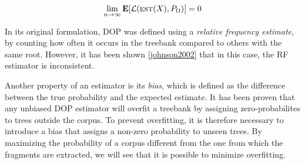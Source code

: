 $$\lim_{n \to \infty} \mathbf{E}[\mathcal{L}(\textsc{est}(X), P_\Omega)] = 0 $$


In its original formulation, DOP was defined using a \emph{relative frequency estimate}, by counting how often it occurs in the treebank compared to others with the same root. However, it has been shown \ref{johnson2002} that in this case, the RF estimator is inconsistent.

Another property of an estimator is its \emph{bias}, which is defined as the difference between the true probability and the expected estimate. 
It has been proven that any unbiased DOP estimator will overfit a treebank by assigning zero-probabilites to trees outside the corpus.
To prevent overfitting, it is therefore necessary to introduce a bias that assigns a non-zero probability to unseen trees.
By maximizing the probability of a corpus different from the one from which the fragments are extracted, we will see that it is possible to minimize overfitting.




